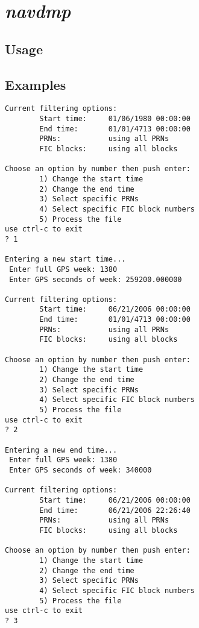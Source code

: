 %
%

\section{\emph{navdmp}}
\subsection{Usage}

\subsection{Examples}
\begin{\outputsize}
\begin{Verbatim}
Current filtering options:
        Start time:     01/06/1980 00:00:00
        End time:       01/01/4713 00:00:00
        PRNs:           using all PRNs
        FIC blocks:     using all blocks

Choose an option by number then push enter:
        1) Change the start time
        2) Change the end time
        3) Select specific PRNs
        4) Select specific FIC block numbers
        5) Process the file
use ctrl-c to exit
? 1

Entering a new start time...
 Enter full GPS week: 1380
 Enter GPS seconds of week: 259200.000000

Current filtering options:
        Start time:     06/21/2006 00:00:00
        End time:       01/01/4713 00:00:00
        PRNs:           using all PRNs
        FIC blocks:     using all blocks

Choose an option by number then push enter:
        1) Change the start time
        2) Change the end time
        3) Select specific PRNs
        4) Select specific FIC block numbers
        5) Process the file
use ctrl-c to exit
? 2

Entering a new end time...
 Enter full GPS week: 1380
 Enter GPS seconds of week: 340000

Current filtering options:
        Start time:     06/21/2006 00:00:00
        End time:       06/21/2006 22:26:40
        PRNs:           using all PRNs
        FIC blocks:     using all blocks

Choose an option by number then push enter:
        1) Change the start time
        2) Change the end time
        3) Select specific PRNs
        4) Select specific FIC block numbers
        5) Process the file
use ctrl-c to exit
? 3


\end{Verbatim}
\end{\outputsize}
